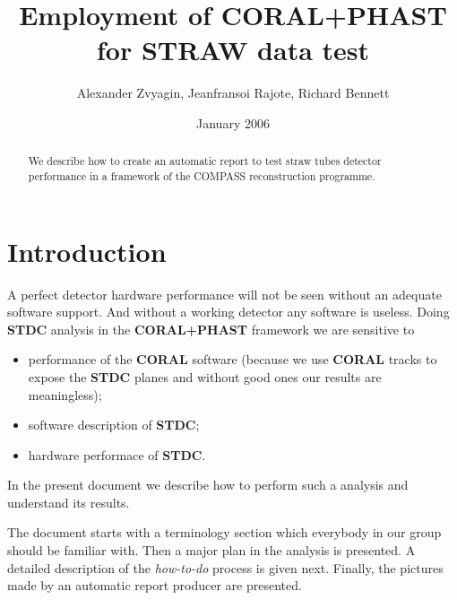 \documentclass[a4paper,12pt]{article}
\author{Alexander Zvyagin, Jeanfransoi Rajote, Richard Bennett}
\title{Employment of CORAL+PHAST for STRAW data test}
\date{January 2006}
\begin{document}
\maketitle

    \begin{abstract}
        We describe how to create an automatic report to test straw tubes detector
        performance in a framework of the COMPASS reconstruction programme.
    \end{abstract}

\tableofcontents

\section{Introduction}
A perfect detector hardware performance will not be seen without an adequate
software support. And without a working detector any software is useless.
Doing {\bf STDC} analysis in the {\bf CORAL+PHAST} framework we are sensitive
to
\begin{itemize}
\item performance of the {\bf CORAL} software (because we use {\bf CORAL}
tracks to expose the {\bf STDC} planes and without good ones our results
are meaningless);
\item software description of {\bf STDC};
\item hardware performace of {\bf STDC}.
\end{itemize}
In the present document we describe how to perform such a analysis and
understand its results.

The document starts with a terminology section which everybody in our group should be familiar with. Then a major plan in the
analysis is presented. A detailed description of the {\it how-to-do} process
is given next. Finally, the pictures made by an automatic
report producer are presented.
\end{document}
